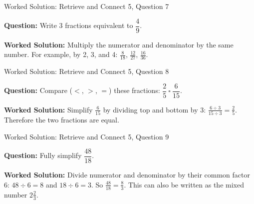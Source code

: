 \documentclass{beamer}
\newcommand{\ashow}[1]{\uncover<2->{\textcolor{red}{\small #1}}}
\begin{document}
\begin{frame}{Worked Solution: Retrieve and Connect 5, Question 7}

\textbf{Question:} Write 3 fractions equivalent to $\dfrac{4}{9}$.

\textbf{Worked Solution:} Multiply the numerator and denominator by the same number. For example, by 2, 3, and 4: $\frac{8}{18}$, $\frac{12}{27}$, $\frac{16}{36}$. \ashow{$\frac{8}{18},\ \frac{12}{27},\ \frac{16}{36}$.}
\end{frame}

\begin{frame}{Worked Solution: Retrieve and Connect 5, Question 8}

\textbf{Question:} Compare ($<$, $>$, $=$) these fractions: $\dfrac{2}{5}\ \square\ \dfrac{6}{15}$.

\textbf{Worked Solution:} Simplify $\frac{6}{15}$ by dividing top and bottom by 3: $\frac{6 \div 3}{15 \div 3} = \frac25$. Therefore the two fractions are equal. \ashow{$=$}
\end{frame}

\begin{frame}{Worked Solution: Retrieve and Connect 5, Question 9}

\textbf{Question:} Fully simplify $\dfrac{48}{18}$.

\textbf{Worked Solution:} Divide numerator and denominator by their common factor 6: $48 \div 6 = 8$ and $18 \div 6 = 3$. So $\frac{48}{18} = \frac83$. This can also be written as the mixed number $2\frac23$. \ashow{$\frac83$ or $2\frac23$.}
\end{frame}
\end{document}
